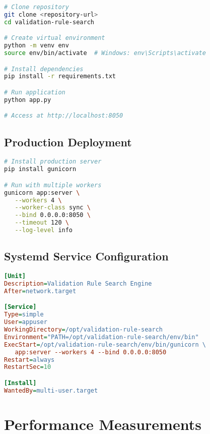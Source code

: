 \begin{lstlisting}[language=bash, caption={Local development setup}, label={lst:local-setup}]
# Clone repository
git clone <repository-url>
cd validation-rule-search

# Create virtual environment
python -m venv env
source env/bin/activate  # Windows: env\Scripts\activate

# Install dependencies
pip install -r requirements.txt

# Run application
python app.py

# Access at http://localhost:8050
\end{lstlisting}

\subsection{Production Deployment}

\begin{lstlisting}[language=bash, caption={Production deployment with gunicorn}, label={lst:prod-deploy}]
# Install production server
pip install gunicorn

# Run with multiple workers
gunicorn app:server \
   --workers 4 \
   --worker-class sync \
   --bind 0.0.0.0:8050 \
   --timeout 120 \
   --log-level info
\end{lstlisting}

\subsection{Systemd Service Configuration}

\begin{lstlisting}[language=ini, caption={Systemd service configuration}, label={lst:systemd}]
[Unit]
Description=Validation Rule Search Engine
After=network.target

[Service]
Type=simple
User=appuser
WorkingDirectory=/opt/validation-rule-search
Environment="PATH=/opt/validation-rule-search/env/bin"
ExecStart=/opt/validation-rule-search/env/bin/gunicorn \
   app:server --workers 4 --bind 0.0.0.0:8050
Restart=always
RestartSec=10

[Install]
WantedBy=multi-user.target
\end{lstlisting}

\clearpage
\section{Performance Measurements}
\label{sec:app-performance}

